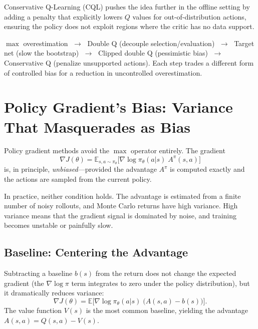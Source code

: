 Conservative Q-Learning (CQL) pushes the idea further in the offline setting by
adding a penalty that explicitly lowers $Q$ values for out-of-distribution
actions, ensuring the policy does not exploit regions where the critic has no
data support.

\begin{keyidea}
$\max$ overestimation $\;\longrightarrow\;$
Double Q (decouple selection/evaluation) $\;\longrightarrow\;$
Target net (slow the bootstrap) $\;\longrightarrow\;$
Clipped double Q (pessimistic bias) $\;\longrightarrow\;$
Conservative Q (penalize unsupported actions).
Each step trades a different form of controlled bias for a reduction in
uncontrolled overestimation.
\end{keyidea}


\section{Policy Gradient's Bias: Variance That Masquerades as Bias}
\label{sec:pg-bias}

Policy gradient methods avoid the $\max$ operator entirely.  The gradient
\begin{equation}
  \nabla J(\theta) = \mathbb{E}_{s,a \sim \pi_\theta}
  \bigl[\nabla \log \pi_\theta(a|s)\; A^{\pi}(s,a)\bigr]
\end{equation}
is, in principle, \emph{unbiased}---provided the advantage $A^{\pi}$ is computed
exactly and the actions are sampled from the current policy.

In practice, neither condition holds.  The advantage is estimated from a finite
number of noisy rollouts, and Monte Carlo returns have high variance.  High
variance means that the gradient signal is dominated by noise, and training
becomes unstable or painfully slow.

\subsection{Baseline: Centering the Advantage}

Subtracting a baseline $b(s)$ from the return does not change the expected
gradient (the $\nabla\log\pi$ term integrates to zero under the policy
distribution), but it dramatically reduces variance:
\begin{equation}
  \nabla J(\theta) = \mathbb{E}\bigl[\nabla \log \pi_\theta(a|s)\;
  \bigl(A(s,a) - b(s)\bigr)\bigr].
\end{equation}
The value function $V(s)$ is the most common baseline, yielding the advantage
$A(s,a) = Q(s,a) - V(s)$.

